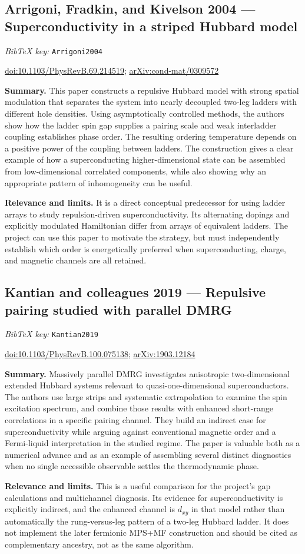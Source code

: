 \documentclass[11pt]{article}
\newcommand{\paper}[2]{\Needspace{8\baselineskip}\subsection{#2}\label{paper:#1}\textit{BibTeX key:} \texttt{#1}\quad\citep{#1}\par}
\newcommand{\doi}[1]{\href{https://doi.org/#1}{doi:#1}}
\newcommand{\arxiv}[1]{\href{https://arxiv.org/abs/#1}{arXiv:#1}}
\newcommand{\summary}{\par\textbf{Summary.} }
\newcommand{\relevance}{\par\textbf{Relevance and limits.} }
\begin{document}
\paper{Arrigoni2004}{Arrigoni, Fradkin, and Kivelson 2004 --- Superconductivity in a striped Hubbard model}
\doi{10.1103/PhysRevB.69.214519}; \arxiv{cond-mat/0309572}
\summary This paper constructs a repulsive Hubbard model with strong spatial modulation that separates the system into nearly decoupled two-leg ladders with different hole densities. Using asymptotically controlled methods, the authors show how the ladder spin gap supplies a pairing scale and weak interladder coupling establishes phase order. The resulting ordering temperature depends on a positive power of the coupling between ladders. The construction gives a clear example of how a superconducting higher-dimensional state can be assembled from low-dimensional correlated components, while also showing why an appropriate pattern of inhomogeneity can be useful.
\relevance It is a direct conceptual predecessor for using ladder arrays to study repulsion-driven superconductivity. Its alternating dopings and explicitly modulated Hamiltonian differ from arrays of equivalent ladders. The project can use this paper to motivate the strategy, but must independently establish which order is energetically preferred when superconducting, charge, and magnetic channels are all retained.

\paper{Kantian2019}{Kantian and colleagues 2019 --- Repulsive pairing studied with parallel DMRG}
\doi{10.1103/PhysRevB.100.075138}; \arxiv{1903.12184}
\summary Massively parallel DMRG investigates anisotropic two-dimensional extended Hubbard systems relevant to quasi-one-dimensional superconductors. The authors use large strips and systematic extrapolation to examine the spin excitation spectrum, and combine those results with enhanced short-range correlations in a specific pairing channel. They build an indirect case for superconductivity while arguing against conventional magnetic order and a Fermi-liquid interpretation in the studied regime. The paper is valuable both as a numerical advance and as an example of assembling several distinct diagnostics when no single accessible observable settles the thermodynamic phase.
\relevance This is a useful comparison for the project's gap calculations and multichannel diagnosis. Its evidence for superconductivity is explicitly indirect, and the enhanced channel is $d_{xy}$ in that model rather than automatically the rung-versus-leg pattern of a two-leg Hubbard ladder. It does not implement the later fermionic MPS+MF construction and should be cited as complementary ancestry, not as the same algorithm.
\end{document}
